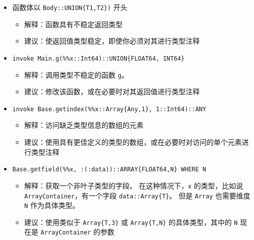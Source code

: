 \begin{itemize}
\item 函数体以 \texttt{Body::UNION\{T1,T2\})} 开头

\begin{itemize}
\item 解释：函数具有不稳定返回类型


\item 建议：使返回值类型稳定，即使你必须对其进行类型注释

\end{itemize}

\item \texttt{invoke Main.g(\%\%x::Int64)::UNION\{FLOAT64, INT64\}}

\begin{itemize}
\item 解释：调用类型不稳定的函数 \texttt{g}。


\item 建议：修改该函数，或在必要时对其返回值进行类型注释

\end{itemize}

\item \texttt{invoke Base.getindex(\%\%x::Array\{Any,1\}, 1::Int64)::ANY}

\begin{itemize}
\item 解释：访问缺乏类型信息的数组的元素


\item 建议：使用具有更佳定义的类型的数组，或在必要时对访问的单个元素进行类型注释

\end{itemize}

\item \texttt{Base.getfield(\%\%x, :(:data))::ARRAY\{FLOAT64,N\} WHERE N}

\begin{itemize}
\item 解释：获取一个非叶子类型的字段。 在这种情况下，\texttt{x} 的类型，比如说 \texttt{ArrayContainer}，有一个字段 \texttt{data::Array\{T\}}。 但是 \texttt{Array} 也需要维度 \texttt{N} 作为具体类型。


\item 建议：使用类似于 \texttt{Array\{T,3\}} 或 \texttt{Array\{T,N\}} 的具体类型，其中的 \texttt{N} 现在是 \texttt{ArrayContainer} 的参数

\end{itemize}
\end{itemize}


